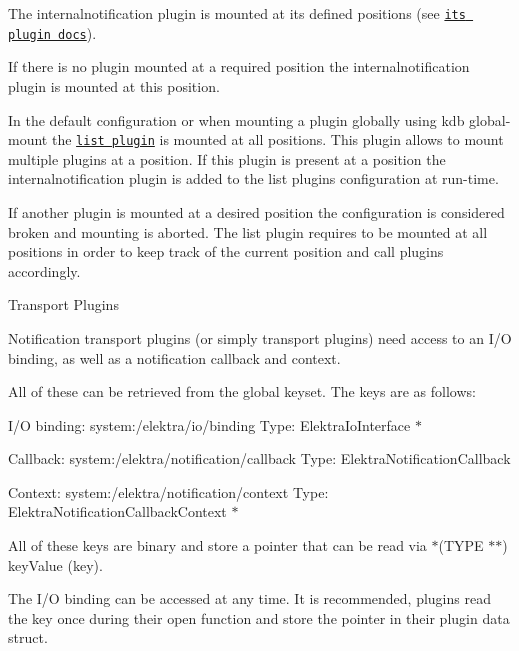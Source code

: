 The internalnotification plugin is mounted at its defined positions (see \href{https://www.libelektra.org/plugins/internalnotification}{\tt its plugin docs}).


\begin{DoxyItemize}
\item If there is no plugin mounted at a required position the internalnotification plugin is mounted at this position.
\item In the default configuration or when mounting a plugin globally using {\ttfamily kdb global-\/mount} the \href{https://www.libelektra.org/plugins/list}{\tt list plugin} is mounted at all positions. This plugin allows to mount multiple plugins at a position. If this plugin is present at a position the internalnotification plugin is added to the list plugin\textquotesingle{}s configuration at run-\/time.
\item If another plugin is mounted at a desired position the configuration is considered broken and mounting is aborted. The list plugin requires to be mounted at all positions in order to keep track of the current position and call plugins accordingly.
\end{DoxyItemize}

\begin{DoxyParagraph}{Transport Plugins}

\end{DoxyParagraph}
Notification transport plugins (or simply transport plugins) need access to an I/O binding, as well as a notification callback and context.

All of these can be retrieved from the global keyset. The keys are as follows\+:
\begin{DoxyItemize}
\item I/O binding\+: {\ttfamily system\+:/elektra/io/binding} Type\+: {\ttfamily Elektra\+Io\+Interface $\ast$}
\item Callback\+: {\ttfamily system\+:/elektra/notification/callback} Type\+: {\ttfamily Elektra\+Notification\+Callback}
\item Context\+: {\ttfamily system\+:/elektra/notification/context} Type\+: {\ttfamily Elektra\+Notification\+Callback\+Context $\ast$}
\end{DoxyItemize}

All of these keys are binary and store a pointer that can be read via {\ttfamily $\ast$(T\+Y\+PE $\ast$$\ast$) key\+Value (key)}.

The I/O binding can be accessed at any time. It is recommended, plugins read the key once during their {\ttfamily open} function and store the pointer in their plugin data struct.

